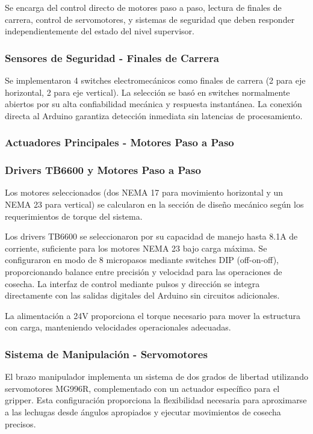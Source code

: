 Se encarga del control directo de motores paso a paso, lectura de finales de carrera, control de servomotores, y sistemas de seguridad que deben responder independientemente del estado del nivel supervisor.

\subsubsection{Sensores de Seguridad - Finales de Carrera}

Se implementaron 4 switches electromecánicos como finales de carrera (2 para eje horizontal, 2 para eje vertical). La selección se basó en switches normalmente abiertos por su alta confiabilidad mecánica y respuesta instantánea. La conexión directa al Arduino garantiza detección inmediata sin latencias de procesamiento.

\subsubsection{Actuadores Principales - Motores Paso a Paso}

\subsubsection{Drivers TB6600 y Motores Paso a Paso}

Los motores seleccionados (dos NEMA 17 para movimiento horizontal y un NEMA 23 para vertical) se calcularon en la sección de diseño mecánico según los requerimientos de torque del sistema.

Los drivers TB6600 se seleccionaron por su capacidad de manejo hasta 8.1A de corriente, suficiente para los motores NEMA 23 bajo carga máxima. Se configuraron en modo de 8 micropasos mediante switches DIP (off-on-off), proporcionando balance entre precisión y velocidad para las operaciones de cosecha. La interfaz de control mediante pulsos y dirección se integra directamente con las salidas digitales del Arduino sin circuitos adicionales.

La alimentación a 24V proporciona el torque necesario para mover la estructura con carga, manteniendo velocidades operacionales adecuadas.

\subsubsection{Sistema de Manipulación - Servomotores}

El brazo manipulador implementa un sistema de dos grados de libertad utilizando servomotores MG996R, complementado con un actuador específico para el gripper. Esta configuración proporciona la flexibilidad necesaria para aproximarse a las lechugas desde ángulos apropiados y ejecutar movimientos de cosecha precisos.

